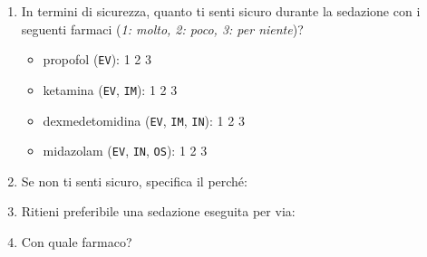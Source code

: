 \begin{tcolorbox}
\begin{enumerate}
           \item In termini di sicurezza, quanto ti senti sicuro durante la sedazione con i seguenti farmaci (\emph{1: molto, 2: poco, 3: per niente})?
           \begin{itemize}
               \item propofol (\texttt{EV}): \colorbox{xkcdCloudyBlue!70}{1} \colorbox{xkcdCloudyBlue!70}{2} \colorbox{xkcdCloudyBlue!70}{3}
               \item ketamina (\texttt{EV}, \texttt{IM}): \colorbox{xkcdCloudyBlue!70}{1} \colorbox{xkcdCloudyBlue!70}{2} \colorbox{xkcdCloudyBlue!70}{3}
               \item dexmedetomidina (\texttt{EV}, \texttt{IM}, \texttt{IN}): \colorbox{xkcdCloudyBlue!70}{1} \colorbox{xkcdCloudyBlue!70}{2} \colorbox{xkcdCloudyBlue!70}{3}
               \item midazolam (\texttt{EV}, \texttt{IN}, \texttt{OS}): \colorbox{xkcdCloudyBlue!70}{1} \colorbox{xkcdCloudyBlue!70}{2} \colorbox{xkcdCloudyBlue!70}{3}
           \end{itemize}
           
           \item Se non ti senti sicuro, specifica il perché: 
           \item Ritieni preferibile una sedazione eseguita per via:
           
           \item Con quale farmaco?
           

\end{enumerate}
\end{tcolorbox}
